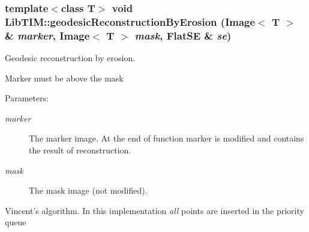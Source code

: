 \subsubsection{\setlength{\rightskip}{0pt plus 5cm}template$<$class T$>$ void Lib\-TIM::geodesic\-Reconstruction\-By\-Erosion (Image$<$ T $>$ \& {\em marker}, Image$<$ T $>$ {\em mask}, Flat\-SE \& {\em se})}\label{group__reconstruction_ga0}


Geodesic reconstruction by erosion. 

Marker must be above the mask \begin{Desc}
\item[Parameters:]
\begin{description}
\item[{\em marker}]The marker image. At the end of function marker is modified and contains the result of reconstruction. \item[{\em mask}]The mask image (not modified).\end{description}
\end{Desc}
Vincent's algorithm. In this implementation {\em all\/} points are inserted in the priority queue